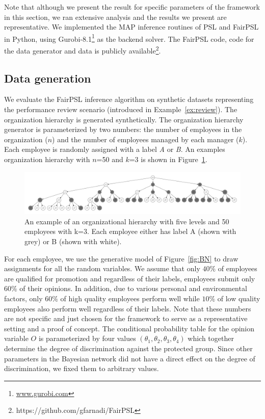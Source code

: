 \documentclass[11pt]{article}
\begin{document}
Note that although we present the result for specific parameters of the framework in this section, we ran extensive analysis and the results we present are representative. We implemented the MAP inference routines of PSL and FairPSL in Python, using Gurobi-8.1\footnote{\url{www.gurobi.com}} as the backend solver. The FairPSL code, code for the data generator and data is publicly available\footnote{https://github.com/gfarnadi/FairPSL}. 

\subsection{Data generation}
  
We evaluate the FairPSL inference algorithm on synthetic datasets representing the performance review scenario (introduced in Example~\ref{ex:review}). The organization hierarchy is generated synthetically. 
The organization hierarchy generator is parameterized by two numbers: the number of employees in the organization ($n$) and the number of employees managed by each manager ($k$). Each employee is randomly assigned with a label \emph{A} or \emph{B}. An examples organization hierarchy with $n$=50 and $k$=3 is shown in Figure~\ref{fig:hierachy}.

\begin{figure}
  \begin{minipage}[c]{0.3\textwidth}
    \caption{
        \small An example of an organizational hierarchy with five levels and 50 employees with k=3. Each employee either has label A (shown with grey) or B (shown with white).
    }\label{fig:hierachy} 
	\end{minipage} \hfill
    \begin{minipage}[c]{0.7\textwidth}
    \includegraphics[width=\textwidth]{figs/Uni-hierachy.pdf}
  \end{minipage}
\end{figure}

For each employee, we use the generative model of Figure~\ref{fig:BN} to draw assignments for all the random variables. We assume that only $40\%$ of employees are qualified for promotion and regardless of their labels, employees submit only $60\%$ of their opinions. In addition, due to various personal and environmental factors, only $60\%$ of high quality employees perform well while $10\%$ of low quality employees also perform well regardless of their labels. Note that these numbers are not specific and just chosen for the framework to serve as a representative setting and a proof of concept. The conditional probability table for the opinion variable $O$ is parameterized by four values $(\theta_1, \theta_2, \theta_3, \theta_4)$ which together determine the degree of discrimination against the protected group. Since other parameters in the Bayesian network did not have a direct effect on the degree of discrimination, we fixed them to arbitrary values. 
\end{document}

